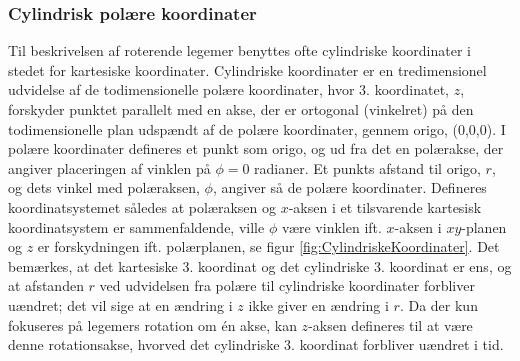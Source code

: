 \subsubsection{Cylindrisk polære koordinater}
Til beskrivelsen af roterende legemer benyttes ofte cylindriske koordinater i stedet for kartesiske koordinater. Cylindriske koordinater er en tredimensionel udvidelse af de todimensionelle polære koordinater, hvor 3. koordinatet, $z$, forskyder punktet parallelt med en akse, der er ortogonal (vinkelret) på den todimensionelle plan udspændt af de polære koordinater, gennem origo, (0,0,0). I polære koordinater defineres et punkt  som origo, og ud fra det en polærakse, der angiver placeringen af vinklen på $\phi = 0$ radianer. Et punkts afstand til origo, $r$, og dets vinkel med polæraksen, $\phi$, angiver så de polære koordinater. Defineres koordinatsystemet således at polæraksen og $x$-aksen i et tilsvarende kartesisk koordinatsystem er sammenfaldende, ville $\phi$ være vinklen ift. $x$-aksen i $xy$-planen og $z$ er forskydningen ift. polærplanen, se figur \ref{fig:CylindriskeKoordinater}. Det bemærkes, at det kartesiske 3. koordinat og det cylindriske 3. koordinat er ens, og at afstanden $r$ ved udvidelsen fra polære til cylindriske koordinater forbliver uændret; det vil sige at en ændring i $z$ ikke giver en ændring i $r$. Da der kun fokuseres på legemers rotation om én akse, kan $z$-aksen defineres til at være denne rotationsakse, hvorved det cylindriske 3. koordinat forbliver uændret i tid.  \\

